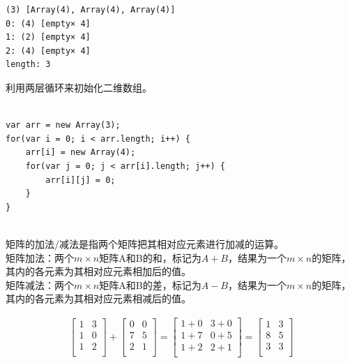 \begin{tcolorbox}
	\begin{verbatim}
(3) [Array(4), Array(4), Array(4)]
0: (4) [empty× 4]
1: (2) [empty× 4]
2: (4) [empty× 4]
length: 3
	\end{verbatim}
\end{tcolorbox}

利用两层循环来初始化二维数组。 \\

 \\

\begin{lstlisting}[style=htmlcssjs]
var arr = new Array(3);
for(var i = 0; i < arr.length; i++) {
    arr[i] = new Array(4);
    for(var j = 0; j < arr[i].length; j++) {
        arr[i][j] = 0;
    }
}
\end{lstlisting}

\vspace{0.5cm}

 \\

矩阵的加法/减法是指两个矩阵把其相对应元素进行加减的运算。 \\

矩阵加法：两个$ m \times n $矩阵A和B的和，标记为$ A + B $，结果为一个$ m \times n $的矩阵，其内的各元素为其相对应元素相加后的值。 \\

矩阵减法：两个$ m \times n $矩阵A和B的差，标记为$ A - B $，结果为一个$ m \times n $的矩阵，其内的各元素为其相对应元素相减后的值。

\begin{align}\nonumber
	\left[\begin{matrix}
			1 & 3 \\
			1 & 0 \\
			1 & 2 \\
		\end{matrix} \right]
	+
	\left[\begin{matrix}
			0 & 0 \\
			7 & 5 \\
			2 & 1 \\
		\end{matrix} \right]
	=
	\left[\begin{matrix}
			1+0 & 3+0 \\
			1+7 & 0+5 \\
			1+2 & 2+1 \\
		\end{matrix} \right]
	=
	\left[\begin{matrix}
			1 & 3 \\
			8 & 5 \\
			3 & 3 \\
		\end{matrix} \right]
\end{align}

